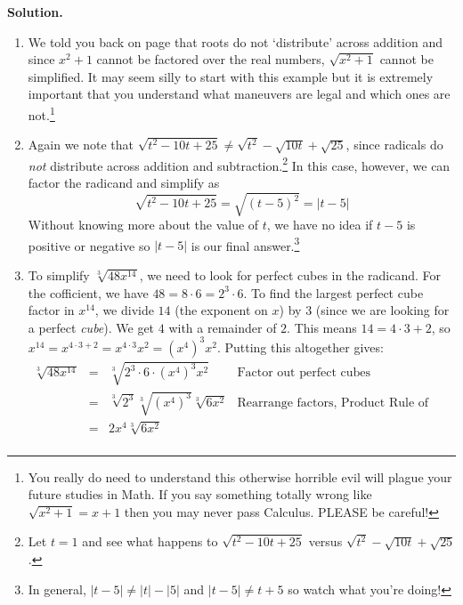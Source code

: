 \documentclass{ximera}
\begin{document}
\begin{example}
{\bf Solution.}

\begin{enumerate}

\item We told you back on page \pageref{donotdistributeexponents} that roots do not `distribute' across addition and since $x^{2} + 1$ cannot be factored over the real numbers, $\sqrt{x^{2} + 1}$ cannot be simplified.  It may seem silly to start with this example but it is extremely important that you understand what maneuvers are legal and which ones are not.\footnote{You really do need to understand this otherwise horrible evil will plague your future studies in Math.  If you say something totally wrong like $\sqrt{x^{2} + 1} = x + 1$ then you may never pass Calculus.  PLEASE be careful!}

\item Again we note that $\sqrt{t^2-10t+25}  \neq \sqrt{t^2} - \sqrt{10t} + \sqrt{25}$, since radicals do \textit{not} distribute across addition and subtraction.\footnote{Let $t = 1$ and see what happens to $\sqrt{t^2-10t+25}$  versus $\sqrt{t^2} - \sqrt{10t} + \sqrt{25}$.}  In this case, however, we can factor the radicand and simplify as \[ \sqrt{t^2 - 10t + 25} = \sqrt{(t-5)^2} = |t-5| \]
Without knowing more about the value of $t$, we have no idea if $t-5$ is positive or negative so $|t-5|$ is our final answer.\footnote{In general,  $|t-5| \neq |t| - |5|$ and  $|t-5| \neq t + 5$ so watch what you're doing!}

\item  To simplify $\sqrt[3]{48x^{14}}$, we need to look for perfect cubes in the radicand.  For the cofficient, we have $48 = 8 \cdot 6 = 2^3 \cdot 6$.  To find the largest perfect cube factor in $x^{14}$, we divide $14$ (the exponent on $x$) by $3$ (since we are looking for a perfect \textit{cube}).  We get $4$ with a remainder of $2$.  This means $14 = 4 \cdot 3 + 2$, so $x^{14} = x^{4 \cdot 3 + 2} = x^{4 \cdot 3} x^2 = (x^4)^3 x^2$.  Putting this altogether gives:\[\begin{array}{rclr}

\sqrt[3]{48x^{14}} & = & \sqrt[3]{2^3 \cdot 6 \cdot(x^4)^3 x^2} & \text{Factor out perfect cubes} \\ [2pt]
                   & = & \sqrt[3]{2^3} \sqrt[3]{(x^4)^3} \sqrt[3]{6x^2} & \text{Rearrange factors,  Product Rule of Radicals} \\ [2pt]
									 & = & 2x^4\sqrt[3]{6x^2} & \\
\end{array} \]


\end{enumerate}
\end{example}
\end{document}
